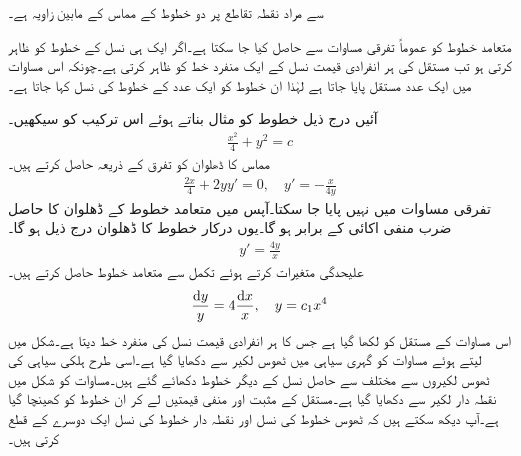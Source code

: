  سے مراد نقطہ تقاطع پر دو خطوط کے مماس کے مابین زاویہ ہے۔

متعامد خطوط کو عموماً تفرقی مساوات سے حاصل کیا جا سکتا ہے۔اگر   ایک ہی نسل کے خطوط کو ظاہر کرتی ہو تب مستقل  کی ہر انفرادی قیمت نسل کے ایک منفرد خط کو ظاہر کرتی ہے۔چونکہ اس مساوات میں ایک عدد مستقل  پایا جاتا ہے لہٰذا ان خطوط کو ایک عدد  کے خطوط کی نسل کہا جاتا ہے۔

 آئیں درج ذیل خطوط کو مثال بناتے ہوئے اس ترکیب کو سیکھیں۔
\begin{align}\label{مساوات_سادہ_اول_کنبہ_خطوط_الف}
\frac{x^2}{4}+y^2=c
\end{align}
مماس کا ڈھلوان  کو تفرق کے ذریعہ حاصل کرتے ہیں۔
\begin{align}
\frac{2x}{4}+2y y'=0,\quad y'=-\frac{x}{4y}
\end{align}
 تفرقی مساوات میں  نہیں پایا جا سکتا۔آپس میں متعامد خطوط کے ڈھلوان کا حاصل ضرب منفی اکائی  کے برابر ہو گا۔یوں درکار خطوط کا ڈھلوان درج ذیل ہو گا۔
\begin{align}
y'=\frac{4y}{x}
\end{align}
علیحدگی متغیرات کرتے ہوئے تکمل سے متعامد خطوط حاصل کرتے ہیں۔
\begin{align}\label{مساوات_سادہ_اول_کنبہ_خطوط_ت}
\frac{\dif y}{y}=4\frac{\dif x}{x},\quad y=c_1 x^4
\end{align}
اس مساوات کے مستقل کو  لکھا گیا ہے  جس کا ہر انفرادی قیمت نسل کی منفرد خط دیتا ہے۔شکل  میں  لیتے ہوئے مساوات  کو گہری سیاہی میں ٹھوس لکیر سے دکھایا گیا ہے۔اسی طرح ہلکی سیاہی  کی ٹھوس لکیروں سے  مختلف  سے حاصل نسل کے دیگر خطوط دکھائے گئے ہیں۔مساوات  کو شکل میں نقطہ دار لکیر سے دکھایا گیا ہے۔مستقل  کے مثبت اور منفی قیمتیں لے کر ان خطوط کو کھینچا گیا ہے۔آپ دیکھ سکتے ہیں کہ ٹھوس خطوط کی نسل اور نقطہ دار خطوط کی نسل ایک دوسرے کے   قطع کرتی  ہیں۔ 
